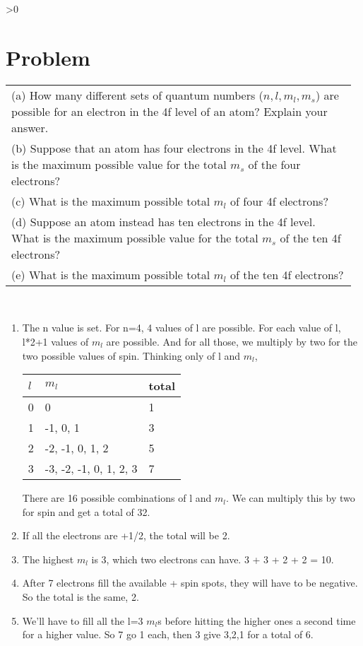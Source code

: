 \documentclass{article}
\newcounter{problemnumber}\setcounter{problemnumber}{1}
\newcommand{\problem}[1][-1]{
    \setcounter{partnumber}{1}
    \ifnum#1>0
        \setcounter{problemnumber}{#1}
    \fi
    \section*{Problem \arabic{problemnumber}}
    \stepcounter{problemnumber}
}
\newcounter{partnumber}\setcounter{partnumber}{1}
\newenvironment{question}{
    \color{gray}\itshape
    \vspace{5pt}
    \begin{tabular}{|p{0.97\linewidth}}
}{
    \end{tabular}\\[5pt]
}
\begin{document}
\problem
\begin{question}
	(a) How many different sets of quantum numbers ($n, l, m_l, m_s$) are possible for an electron in the 4f level of an atom? Explain your answer. \\
(b) Suppose that an atom has four electrons in the 4f level. What is the maximum
possible value for the total $m_s$ of the four electrons? \\
(c) What is the maximum possible total $m_l$ of four 4f electrons? \\
(d) Suppose an atom instead has ten electrons in the 4f level. What is the maximum possible value for the total $m_s$ of the ten 4f electrons? \\
(e) What is the maximum possible total $m_l$ of the ten 4f electrons?
\end{question}

\begin{enumerate}[label=\textbf{\alph*.)}]
	\item The n value is set. For n=4, 4 values of l are possible. For each value of l, l*2+1 values of $m_l$ are possible. And for all those, we multiply by two for the two possible values of spin. Thinking only of l and $m_l$, \\
		\begin{table}[h]
		\begin{tabular}{l|l|l}
			$l$ & $m_l$ & total \\\hline
			0   &  0  & 1 \\
			1   &  -1, 0, 1  & 3 \\
			2   &  -2, -1, 0, 1, 2  & 5 \\
			3   &  -3, -2, -1, 0, 1, 2, 3  & 7 \\
		\end{tabular}
		\end{table}
		There are 16 possible combinations of l and $m_l$. We can multiply this by two for spin and get a total of 32.
	\item  If all the electrons are +1/2, the total will be 2.
	\item  The highest $m_l$ is 3, which two electrons can have. 3 + 3 + 2 + 2 = 10.
	\item  After 7 electrons fill the available + spin spots, they will have to be negative. So the total is the same, 2.
	\item  We'll have to fill all the l=3 $m_l$s before hitting the higher ones a second time for a higher value. So 7 go 1 each, then 3 give 3,2,1 for a total of 6.
\end{enumerate}
\end{document}
